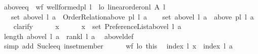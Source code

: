 \begin{isabellebody}
\isanewline
{}\isamarkupfalse%
\ aboveeq{\isacharcolon}{\kern0pt}\ \ wf{\isacharcolon}{\kern0pt}\ {\isachardoublequoteopen}well{\isacharunderscore}{\kern0pt}formed{\isacharunderscore}{\kern0pt}pl\ l{\isachardoublequoteclose}\ \ lo{\isacharcolon}{\kern0pt}\ {\isachardoublequoteopen}linear{\isacharunderscore}{\kern0pt}order{\isacharunderscore}{\kern0pt}on{\isacharunderscore}{\kern0pt}l\ A\ l{\isachardoublequoteclose}\isanewline
\ \ \ {\isachardoublequoteopen}set\ {\isacharparenleft}{\kern0pt}above{\isacharunderscore}{\kern0pt}l\ l\ a{\isacharparenright}{\kern0pt}\ {\isacharequal}{\kern0pt}\ Order{\isacharunderscore}{\kern0pt}Relation{\isachardot}{\kern0pt}above\ {\isacharparenleft}{\kern0pt}pl{\isacharunderscore}{\kern0pt}{\isasymalpha}\ l{\isacharparenright}{\kern0pt}\ a{\isachardoublequoteclose}\isanewline
%
\isadelimproof
%
\endisadelimproof
%
\isatagproof
{}\isamarkupfalse%
\isanewline
\ \ \isamarkupfalse%
\ {\isachardoublequoteopen}set\ {\isacharparenleft}{\kern0pt}above{\isacharunderscore}{\kern0pt}l\ l\ a{\isacharparenright}{\kern0pt}\ {\isasymsubseteq}\ above\ {\isacharparenleft}{\kern0pt}pl{\isacharunderscore}{\kern0pt}{\isasymalpha}\ l{\isacharparenright}{\kern0pt}\ a{\isachardoublequoteclose}\isanewline
\ \ \isamarkupfalse%
\ clarify\isanewline
\ \ \ \ \isamarkupfalse%
\ x\isanewline
\ \ \ \ \isamarkupfalse%
\ {\isachardoublequoteopen}x\ {\isasymin}\ set\ {\isacharparenleft}{\kern0pt}Preference{\isacharunderscore}{\kern0pt}List{\isachardot}{\kern0pt}above{\isacharunderscore}{\kern0pt}l\ l\ a{\isacharparenright}{\kern0pt}{\isachardoublequoteclose}\isanewline
\ \ \ \ \isamarkupfalse%
\ {\isachardoublequoteopen}length\ {\isacharparenleft}{\kern0pt}above{\isacharunderscore}{\kern0pt}l\ l\ a{\isacharparenright}{\kern0pt}\ {\isacharequal}{\kern0pt}\ rank{\isacharunderscore}{\kern0pt}l\ l\ a{\isachardoublequoteclose}\ \isamarkupfalse%
\ above{\isacharunderscore}{\kern0pt}l{\isacharunderscore}{\kern0pt}def\isanewline
\ \ \ \ \ \ \isamarkupfalse%
\ {\isacharparenleft}{\kern0pt}simp\ add{\isacharcolon}{\kern0pt}\ Suc{\isacharunderscore}{\kern0pt}le{\isacharunderscore}{\kern0pt}eq\ in{\isacharunderscore}{\kern0pt}set{\isacharunderscore}{\kern0pt}member{\isacharparenright}{\kern0pt}\isanewline
\ \ \ \ \isamarkupfalse%
\ wf\ lo\ this\ \isamarkupfalse%
\ {\isachardoublequoteopen}index\ l\ x\ {\isasymle}\ index\ l\ a{\isachardoublequoteclose}\ \isamarkupfalse%

\end{isabellebody}
